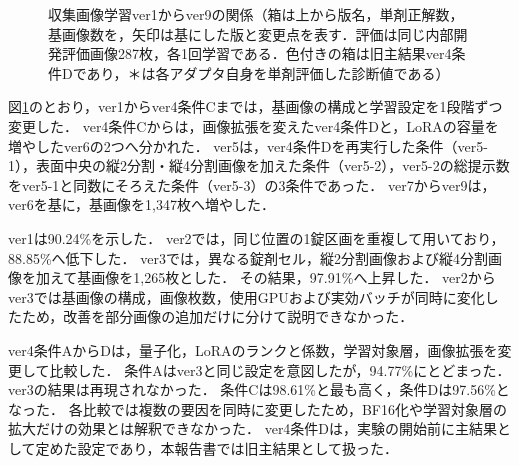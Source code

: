 \documentclass[uplatex,dvipdfmx]{jsarticle}
\begin{document}
\begin{figure}[htbp]
  \caption{収集画像学習ver1からver9の関係（箱は上から版名，単剤正解数，基画像数を，矢印は基にした版と変更点を表す．評価は同じ内部開発評価画像287枚，各1回学習である．色付きの箱は旧主結果ver4条件Dであり，＊は各アダプタ自身を単剤評価した診断値である）}
  \label{fig:ver_lineage}
\end{figure}

図\ref{fig:ver_lineage}のとおり，ver1からver4条件Cまでは，基画像の構成と学習設定を1段階ずつ変更した．
ver4条件Cからは，画像拡張を変えたver4条件Dと，LoRAの容量を増やしたver6の2つへ分かれた．
ver5は，ver4条件Dを再実行した条件（ver5-1），表面中央の縦2分割・縦4分割画像を加えた条件（ver5-2），ver5-2の総提示数をver5-1と同数にそろえた条件（ver5-3）の3条件であった．
ver7からver9は，ver6を基に，基画像を1,347枚へ増やした．

ver1は90.24\%を示した．
ver2では，同じ位置の1錠区画を重複して用いており，88.85\%へ低下した．
ver3では，異なる錠剤セル，縦2分割画像および縦4分割画像を加えて基画像を1,265枚とした．
その結果，97.91\%へ上昇した．
ver2からver3では基画像の構成，画像枚数，使用GPUおよび実効バッチが同時に変化したため，改善を部分画像の追加だけに分けて説明できなかった．

ver4条件AからDは，量子化，LoRAのランクと係数，学習対象層，画像拡張を変更して比較した．
条件Aはver3と同じ設定を意図したが，94.77\%にとどまった．
ver3の結果は再現されなかった．
条件Cは98.61\%と最も高く，条件Dは97.56\%となった．
各比較では複数の要因を同時に変更したため，BF16化や学習対象層の拡大だけの効果とは解釈できなかった．
ver4条件Dは，実験の開始前に主結果として定めた設定であり，本報告書では旧主結果として扱った．
\end{document}
